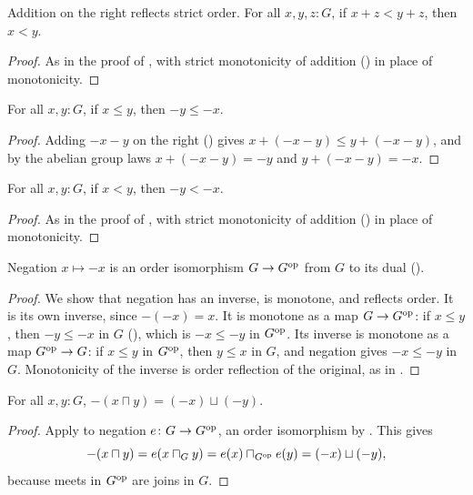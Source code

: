\begin{lemma}
  \label{plusCancelRLt}
  Addition on the right reflects strict order. For all $x, y, z : G$, if $x + z < y + z$, then $x < y$.
\end{lemma}
\begin{proof}
  As in the proof of , with strict monotonicity of addition () in place of monotonicity.
\end{proof}

\begin{lemma}
  \label{negFlipLe}
  For all $x, y : G$, if $x \le y$, then $-y \le -x$.
\end{lemma}
\begin{proof}
  Adding $-x - y$ on the right () gives $x + (-x - y) \le y + (-x - y)$, and by the abelian group laws $x + (-x - y) = -y$ and $y + (-x - y) = -x$.
\end{proof}

\begin{lemma}
  \label{negFlipLt}
  For all $x, y : G$, if $x < y$, then $-y < -x$.
\end{lemma}
\begin{proof}
  As in the proof of , with strict monotonicity of addition () in place of monotonicity.
\end{proof}

\begin{lemma}
  \label{negPseudolatticeEquiv}
  Negation $x \mapsto -x$ is an order isomorphism $G \to G^{\mathrm{op}}$ from $G$ to its dual ().
\end{lemma}
\begin{proof}
  We show that negation has an inverse, is monotone, and reflects order. It is its own inverse, since $-(-x) = x$. It is monotone as a map $G \to G^{\mathrm{op}}$: if $x \le y$, then $-y \le -x$ in $G$ (), which is $-x \le -y$ in $G^{\mathrm{op}}$. Its inverse is monotone as a map $G^{\mathrm{op}} \to G$: if $x \le y$ in $G^{\mathrm{op}}$, then $y \le x$ in $G$, and negation gives $-x \le -y$ in $G$. Monotonicity of the inverse is order reflection of the original, as in .
\end{proof}

\begin{corollary}[\agda{-⊓}]
  \label{negMeet}
  For all $x, y : G$, $-(x \sqcap y) = (-x) \sqcup (-y)$.
\end{corollary}
\begin{proof}
  Apply  to negation $e \colon G \to G^{\mathrm{op}}$, an order isomorphism by . This gives
  \[
    -(x \sqcap y) = e(x \sqcap_{G} y) = e(x) \sqcap_{G^{\mathrm{op}}} e(y) = (-x) \sqcup (-y),
  \]
  because meets in $G^{\mathrm{op}}$ are joins in $G$.
\end{proof}

